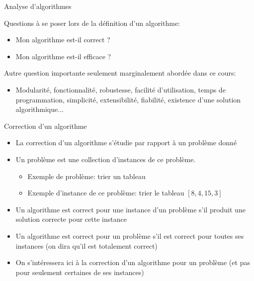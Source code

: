 \begin{frame}{Analyse d'algorithmes}

Questions à se poser lors de la définition d'un algorithme:
\begin{itemize}
\item Mon algorithme est-il correct ?
\item Mon algorithme est-il efficace ? %
\end{itemize}

\bigskip

Autre question importante seulement marginalement abordée dans ce cours:
\begin{itemize}
\item Modularité, fonctionnalité, robustesse, facilité d'utilisation, temps
  de programmation, simplicité, extensibilité, fiabilité,
  existence d'une solution algorithmique...
\end{itemize}

\end{frame}

\begin{frame}{Correction d'un algorithme}%

\begin{itemize}
\item La correction d'un algorithme s'étudie par rapport à un problème donné
\item Un problème est une collection d'instances de ce problème.
\begin{itemize}
\item Exemple de problème: trier un tableau
\item Exemple d'instance de ce problème: trier le tableau $[8,4,15,3]$
\end{itemize}
\item Un algorithme est correct pour une instance d'un problème s'il
  produit une solution correcte pour cette instance
\item Un algorithme est correct pour un problème s'il est correct pour
  toutes ses instances (on dira qu'il est totalement correct)
\item On s'intéressera ici à la correction d'un algorithme pour un
  problème (et pas pour seulement certaines de ses instances)
\end{itemize}

\note{}

\end{frame}

